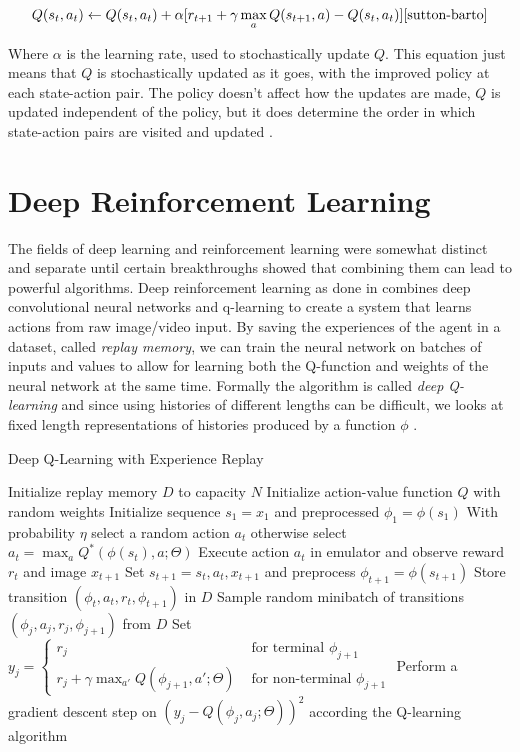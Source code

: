 \documentclass[letterpaper,12pt,titlepage,oneside,final]{book}
\begin{document}
\begin{equation}
	Q(s_t, a_t) \leftarrow Q(s_t, a_t) + \alpha [r_{t+1} + \gamma \max_{a} Q(s_{t+1}, a) - Q(s_t, a_t)] \cite{sutton-barto}
\end{equation}

Where $\alpha$ is the learning rate, used to stochastically update $Q$. This equation just means that $Q$ is stochastically updated as it goes, with the improved policy at each state-action pair. The policy doesn't affect how the updates are made, $Q$ is updated independent of the policy, but it does determine the order in which state-action pairs are visited and updated \cite{sutton-barto}.

\section{Deep Reinforcement Learning}
The fields of deep learning and reinforcement learning were somewhat distinct and separate until certain breakthroughs showed that combining them can lead to powerful algorithms. Deep reinforcement learning as done in \cite{atari-dqn} combines deep convolutional neural networks and q-learning to create a system that learns actions from raw image/video input. By saving the experiences of the agent in a dataset, called \textit{replay memory}, we can train the neural network on batches of inputs and values to allow for learning both the Q-function and weights of the neural network at the same time. Formally the algorithm is called \textit{deep Q-learning} and since using histories of different lengths can be difficult, we looks at fixed length representations of histories produced by a function $\phi$ \cite{atari-dqn}. 


\begin{algorithm}
\caption{Deep Q-Learning with Experience Replay \cite{atari-dqn}}
\label{dqn-algorithm}
\begin{algorithmic}
\STATE Initialize replay memory $D$ to capacity $N$
\STATE Initialize action-value function $Q$ with random weights
\STATE Initialize sequence $s_1 = {x_1}$ and preprocessed $\phi_1 = \phi(s_1)$
\STATE With probability $\eta$ select a random action $a_t$
\STATE otherwise select $a_t = \max_{a} Q^*(\phi(s_t), a; \Theta)$
\STATE Execute action $a_t$ in emulator and observe reward $r_t$ and image $x_{t+1}$ 
\STATE Set $s_{t+1} = s_t, a_t, x_{t+1}$ and preprocess $\phi_{t+1} = \phi(s_{t+1})$
\STATE Store transition $(\phi_t, a_t, r_t, \phi_{t+1})$ in $D$
\STATE Sample random minibatch of transitions $(\phi_j, a_j, r_j, \phi_{j+1})$ from $D$
\STATE Set $ y_j =
	\begin{cases} 
		r_j & \text{ for terminal } \phi_{j+1} \\
		r_j + \gamma \max_{a'} Q(\phi_{j+1}, a'; \Theta) & \text{ for non-terminal } \phi_{j+1}
	\end{cases}
		$
\STATE Perform a gradient descent step on $(y_j - Q(\phi_j, a_j; \Theta))^2$ according the Q-learning algorithm
\ENDFOR
\ENDFOR
\end{algorithmic}
\end{algorithm}
\end{document}
